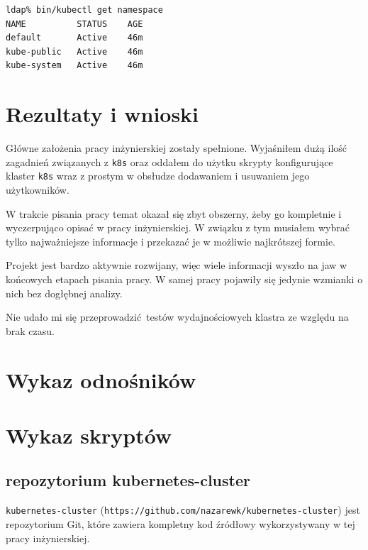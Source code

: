 \documentclass[a4paper,12pt,twoside,openany]{report}
\newcommand{\passthrough}[1]{#1}
\begin{document}
\begin{lstlisting}
ldap% bin/kubectl get namespace 
NAME          STATUS    AGE
default       Active    46m
kube-public   Active    46m
kube-system   Active    46m
\end{lstlisting}

\hypertarget{rezultaty-i-wnioski}{%
\chapter{Rezultaty i wnioski}\label{rezultaty-i-wnioski}}

Główne założenia pracy inżynierskiej zostały spełnione. Wyjaśniłem dużą
ilość zagadnień związanych z \passthrough{\lstinline!k8s!} oraz oddałem
do użytku skrypty konfigurujące klaster \passthrough{\lstinline!k8s!}
wraz z prostym w obsłudze dodawaniem i usuwaniem jego użytkowników.

W trakcie pisania pracy temat okazał się zbyt obszerny, żeby go
kompletnie i wyczerpująco opisać w pracy inżynierskiej. W związku z tym
musiałem wybrać tylko najważniejsze informacje i przekazać je w możliwie
najkrótszej formie.

Projekt jest bardzo aktywnie rozwijany, więc wiele informacji wyszło na
jaw w końcowych etapach pisania pracy. W samej pracy pojawiły się
jedynie wzmianki o nich bez dogłębnej analizy.

Nie udało mi się przeprowadzić~testów wydajnościowych klastra ze względu
na brak czasu. \appendix

\hypertarget{wykaz-odnoux15bnikuxf3w}{%
\chapter{Wykaz odnośników}\label{wykaz-odnoux15bnikuxf3w}}

\theendnotes

\hypertarget{wykaz-skryptuxf3w}{%
\chapter{Wykaz skryptów}\label{wykaz-skryptuxf3w}}

\hypertarget{repozytorium-kubernetes-cluster}{%
\section{repozytorium
kubernetes-cluster}\label{repozytorium-kubernetes-cluster}}

\passthrough{\lstinline!kubernetes-cluster!}
(\passthrough{\lstinline!https://github.com/nazarewk/kubernetes-cluster!})
jest repozytorium Git, które zawiera kompletny kod źródłowy
wykorzystywany w tej pracy inżynierskiej.
\end{document}

